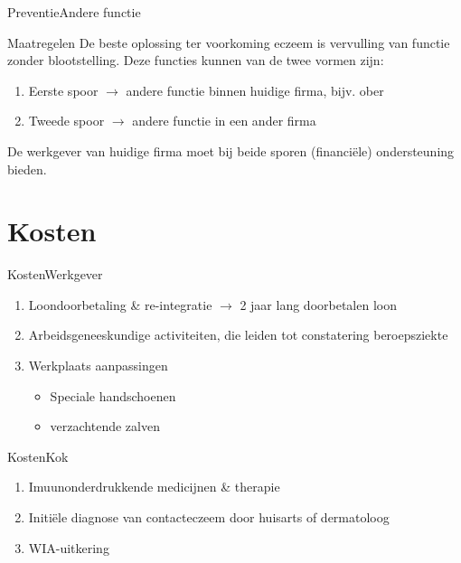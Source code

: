 \documentclass[aspectratio=169]{beamer}
\begin{document}
\begin{frame}{Preventie}{Andere functie}
    \begin{block}{Maatregelen}
        De beste oplossing ter voorkoming eczeem is vervulling van functie zonder blootstelling. Deze functies kunnen van de twee vormen zijn:
            \begin{enumerate}
                \item Eerste spoor $\rightarrow$ andere functie binnen huidige firma, bijv. ober
                \item Tweede spoor $\rightarrow$ andere functie in een ander firma
            \end{enumerate}
            De werkgever van huidige firma moet bij beide sporen (financiële) ondersteuning bieden.
    \end{block}
\end{frame}
\section{Kosten}

\begin{frame}{Kosten}{Werkgever}
    \begin{enumerate}
        \item Loondoorbetaling \& re-integratie $\rightarrow$ 2 jaar lang doorbetalen loon
        \item Arbeidsgeneeskundige activiteiten, die leiden tot constatering beroepsziekte
        \item Werkplaats aanpassingen 
            \begin{itemize}
                \item Speciale handschoenen
                \item verzachtende zalven
            \end{itemize}
    \end{enumerate}
\end{frame}
\begin{frame}{Kosten}{Kok}
    \begin{enumerate}
        \item Imuunonderdrukkende medicijnen \& therapie
        \item Initiële diagnose van contacteczeem door huisarts of dermatoloog
        \item WIA-uitkering
    \end{enumerate}
\end{frame}
{\aauwavesbg
\begin{frame}
\end{frame}}
\end{document}
